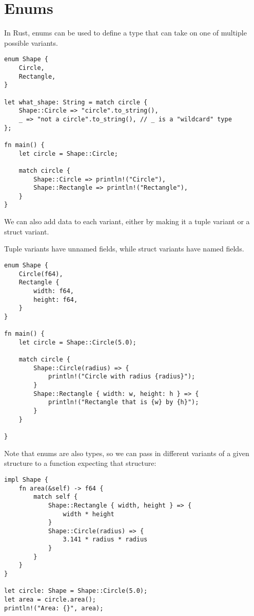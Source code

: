 \section{Enums} 
\begin{definition}
    In Rust, enums can be used to define a type that can take on one of multiple possible variants.
\end{definition}

\begin{lstlisting}[frame = none]
enum Shape {
    Circle,
    Rectangle,
}

let what_shape: String = match circle {
    Shape::Circle => "circle".to_string(),
    _ => "not a circle".to_string(), // _ is a "wildcard" type
};

fn main() {
    let circle = Shape::Circle;

    match circle {
        Shape::Circle => println!("Circle"),
        Shape::Rectangle => println!("Rectangle"),
    }
}
\end{lstlisting}

We can also add data to each variant, either by making it a tuple variant or a struct variant. \\

\begin{definition}Tuple variants have unnamed fields, while struct variants have named fields.
\end{definition}

\begin{lstlisting}[frame = none]
enum Shape {
    Circle(f64),
    Rectangle {
        width: f64,
        height: f64,
    }
}

fn main() {
    let circle = Shape::Circle(5.0);

    match circle {
        Shape::Circle(radius) => {
            println!("Circle with radius {radius}");
        }
        Shape::Rectangle { width: w, height: h } => {
            println!("Rectangle that is {w} by {h}");
        }
    }

}
\end{lstlisting}

Note that enums are also types, so we can pass in different variants of a given structure to a function expecting that structure:
\begin{lstlisting}[frame = none]
impl Shape {
    fn area(&self) -> f64 {
        match self {
            Shape::Rectangle { width, height } => {
                width * height
            }
            Shape::Circle(radius) => {
                3.141 * radius * radius
            }
        }
    }
}

let circle: Shape = Shape::Circle(5.0);
let area = circle.area();
println!("Area: {}", area);

\end{lstlisting}

